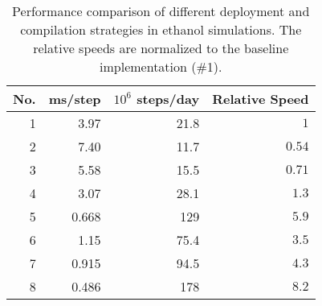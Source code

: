 \begin{table*}[htbp]
\caption{Performance comparison of different deployment
and compilation strategies in ethanol simulations.
The relative speeds are normalized
to the baseline implementation (\#1).}\label{tb:speed8}
\begin{tabular}{rrrr}
\hline
No. & ms/step & $10^6$ steps/day & Relative Speed \\\hline
1   &    3.97 &             21.8 &            $1$ \\
2   &    7.40 &             11.7 &         $0.54$ \\
3   &    5.58 &             15.5 &         $0.71$ \\
4   &    3.07 &             28.1 &          $1.3$ \\
5   &   0.668 &              129 &          $5.9$ \\
6   &    1.15 &             75.4 &          $3.5$ \\
7   &   0.915 &             94.5 &          $4.3$ \\
8   &   0.486 &              178 &          $8.2$ \\\hline
\end{tabular}
\end{table*}
